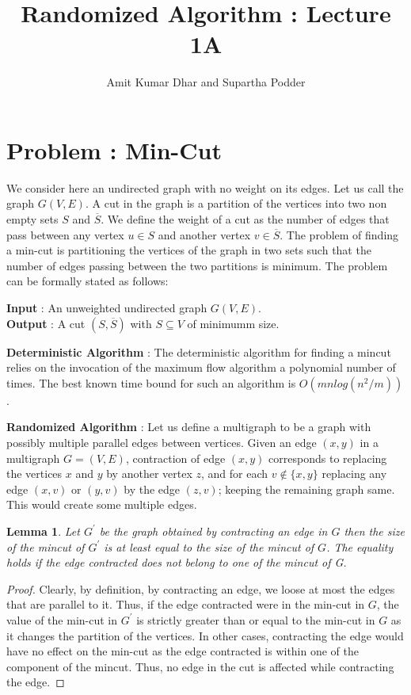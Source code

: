 \documentclass[a4paper,10pt]{article}
\title{Randomized Algorithm : Lecture 1A}
\author{Amit Kumar Dhar and Supartha Podder}
\newtheorem{mylm}{Lemma}
\begin{document}
\maketitle

\section*{Problem : Min-Cut}
We consider here an undirected graph with no weight on its edges. Let us call the graph $G(V,E)$. A cut
in the graph is a partition of the vertices into two non empty sets $S$ and $\overline{S}$. We define 
the weight of a cut as the number of edges that pass between any vertex $u\in S$ and another vertex $v \in \overline{S}$.
The problem of finding a min-cut is partitioning the vertices of the graph in two sets such that the
number of edges passing between the two partitions is minimum. The problem can be formally stated as follows:
\begin{center}
\textbf{Input} : An unweighted undirected graph $G(V,E)$.\\
\textbf{Output} : A cut $(S,\overline{S})$ with $S \subseteq V$ of minimumm size. 
\end{center}

\noindent\textbf{Deterministic Algorithm} : The deterministic algorithm for finding a mincut relies
on the invocation of the maximum flow algorithm a polynomial number of times. The best known time
bound for such an algorithm is $O(mnlog(n^{2}/m))$.


\noindent\textbf{Randomized Algorithm} : Let us define a multigraph to be a graph with possibly multiple
parallel edges between vertices. Given an edge $(x,y)$ in a multigraph $G=(V,E)$, contraction of
edge $(x,y)$ corresponds to replacing the vertices $x$ and $y$ by another vertex $z$, and for each 
$v\notin \{x,y\}$ replacing any edge $(x,v)$ or $(y,v)$ by the edge $(z,v)$; keeping the remaining
graph same. This would create some multiple edges.\\

\begin{mylm}
 Let $G^{\prime}$ be the graph obtained by contracting an edge in $G$ then the size of the mincut of
$G^{\prime}$ is at least equal to the size of the mincut of $G$. The equality holds if the edge 
contracted does not belong to one of the mincut of G.
\end{mylm}
\begin{proof}
 Clearly, by definition, by contracting an edge, we loose at most the edges that are parallel to it. 
Thus, if the edge contracted were in the min-cut in $G$, the value of the min-cut in $G^{\prime}$ is strictly
greater than or equal to the min-cut in $G$ as it changes the partition of the vertices. In other cases, 
contracting the edge would have no effect on the min-cut as the edge contracted is within one of the 
component of the mincut. Thus, no edge in the cut is affected while contracting the edge.
\end{proof}
\end{document}
